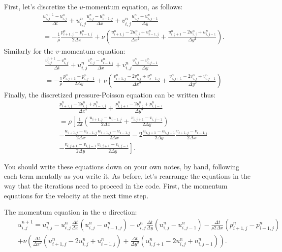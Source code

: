 \documentclass[11pt, sans]{amsart}
\begin{document}
First, let's discretize the $u$-momentum equation, as follows:
\begin{eqnarray}
    &&\frac{u_{i,j}^{n+1}-u_{i,j}^{n}}{\Delta t}+u_{i,j}^{n}\frac{u_{i,j}^{n}-u_{i-1,j}^{n}}{\Delta x}+v_{i,j}^{n}\frac{u_{i,j}^{n}-u_{i,j-1}^{n}}{\Delta y}\\
    &&=-\frac{1}{\rho}\frac{p_{i+1,j}^{n}-p_{i-1,j}^{n}}{2\Delta x}+\nu\left(\frac{u_{i+1,j}^{n}-2u_{i,j}^{n}+u_{i-1,j}^{n}}{\Delta x^2}+\frac{u_{i,j+1}^{n}-2u_{i,j}^{n}+u_{i,j-1}^{n}}{\Delta y^2}\right).
\end{eqnarray}
Similarly for the $v$-momentum equation:
\begin{eqnarray}
    &&\frac{v_{i,j}^{n+1}-v_{i,j}^{n}}{\Delta t}+u_{i,j}^{n}\frac{v_{i,j}^{n}-v_{i-1,j}^{n}}{\Delta x}+v_{i,j}^{n}\frac{v_{i,j}^{n}-v_{i,j-1}^{n}}{\Delta y}\\
    &&=-\frac{1}{\rho}\frac{p_{i,j+1}^{n}-p_{i,j-1}^{n}}{2\Delta y}
    +\nu\left(\frac{v_{i+1,j}^{n}-2v_{i,j}^{n}+v_{i-1,j}^{n}}{\Delta x^2}+\frac{v_{i,j+1}^{n}-2v_{i,j}^{n}+v_{i,j-1}^{n}}{\Delta y^2}\right)
\end{eqnarray}
Finally, the discretized pressure-Poisson equation can be written thus:
\begin{eqnarray}
&&\frac{p_{i+1,j}^{n}-2p_{i,j}^{n}+p_{i-1,j}^{n}}{\Delta x^2}+\frac{p_{i,j+1}^{n}-2p_{i,j}^{n}+p_{i,j-1}^{n}}{\Delta y^2}
\\ &&=\rho\left[\frac{1}{\Delta t}\left(\frac{u_{i+1,j}-u_{i-1,j}}{2\Delta x}+\frac{v_{i,j+1}-v_{i,j-1}}{2\Delta y}\right)
\right. 
\\ && -\frac{u_{i+1,j}-u_{i-1,j}}{2\Delta x} \frac{u_{i+1,j}-u_{i-1,j}}{2\Delta x}
    -  2\frac{u_{i,j+1}-u_{i,j-1}}{2\Delta y} \frac{v_{i+1,j}-v_{i-1,j}}{2\Delta x} \\
    &&- \left.\frac{v_{i,j+1}-v_{i,j-1}}{2\Delta y}\frac{v_{i,j+1}-v_{i,j-1}}{2\Delta y}
\right].
\end{eqnarray}

You should write these equations down on your own notes, by hand, following each term mentally as you write it.
As before, let's rearrange the equations in the way that the iterations need to proceed in the code. First, the momentum equations for the velocity at the next time step.

The momentum equation in the $u$ direction:
\begin{eqnarray}
&& u_{i,j}^{n+1} = u_{i,j}^{n} - u_{i,j}^{n}\frac{\Delta t}{\Delta x}(u_{i,j}^{n}-u_{i-1,j}^{n})
    - v_{i,j}^{n}\frac{\Delta t}{\Delta y}(u_{i,j}^{n}-u_{i,j-1}^{n})
    -\frac{\Delta t}{\rho 2\Delta x}(p_{i+1,j}^{n}-p_{i-1,j}^{n}) \\
    && +\nu\left(\frac{\Delta t}{\Delta x^2}(u_{i+1,j}^{n}-2u_{i,j}^{n}+u_{i-1,j}^{n})\right.
    +\left.\frac{\Delta t}{\Delta y^2}(u_{i,j+1}^{n}-2u_{i,j}^{n}+u_{i,j-1}^{n})\right).
\end{eqnarray}
\end{document}
